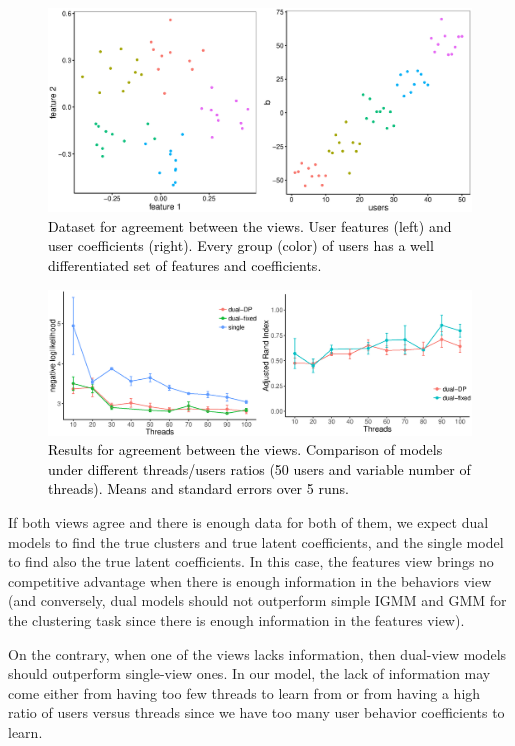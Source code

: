 \documentclass[smallextended]{svjour3}          %
\newcommand\alberto[1]{\textcolor{black}{#1}}
\begin{document}
\begin{figure}
	\centering
	\includegraphics[width=1\textwidth]{Fig2_data_agreement}
	\caption{\alberto{Dataset for agreement between the views. User features (left) and user coefficients (right). Every group (color) of users has a well differentiated set of features and coefficients.}}
	\label{fig:data_agreement}
\end{figure}
\begin{figure}
	\centering
	\includegraphics[width=1\textwidth]{Fig3_results_agreement}%
	\caption{\alberto{Results for agreement between the views. \alberto{Comparison of models under different threads/users ratios (50 users and variable number of threads). Means and standard errors over 5 runs.}}}
	\label{fig:results_agreement}
\end{figure}


If both views agree and there is enough data for both of them, we expect dual models to find the true clusters and true latent coefficients, and the single model to find also the true latent coefficients. In this case, the features view brings no competitive advantage when there is enough information in the behaviors view (and conversely, dual models should not outperform simple IGMM and GMM for the clustering task since there is enough information in the features view).

On the contrary, when one of the views lacks information, then dual-view models should outperform single-view ones. In our model, the lack of information may come either from having too few threads to learn from or from having a high ratio of users versus threads since we have too many user behavior coefficients to learn. 
\end{document}
